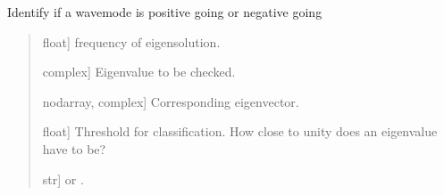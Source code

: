 \documentclass[letterpaper,10pt,english]{sphinxmanual}
\begin{document}
\begin{fulllineitems}
\label{\detokenize{core:pywfe.core.classify_modes.classify_wavemode}}
\pysigstartsignatures
{}
\pysigstopsignatures
\sphinxAtStartPar
Identify if a wavemode is positive going or negative going
\begin{quote}\begin{description}
\begin{description}
\sphinxlineitem{\sphinxstylestrong{f}}{[}float{]}
\sphinxAtStartPar
frequency of eigensolution.

\sphinxlineitem{\sphinxstylestrong{eigenvalue}}{[}complex{]}
\sphinxAtStartPar
Eigenvalue to be checked.

\sphinxlineitem{\sphinxstylestrong{eigenvector}}{[}nodarray, complex{]}
\sphinxAtStartPar
Corresponding eigenvector.

\sphinxlineitem{\sphinxstylestrong{threshold}}{[}float{]}
\sphinxAtStartPar
Threshold for classification. How close to unity does an eigenvalue have to be?

\end{description}

\begin{description}
\sphinxlineitem{\sphinxstylestrong{direction}}{[}str{]}
\sphinxAtStartPar
{} or .

\end{description}

\end{description}\end{quote}

\end{fulllineitems}

\end{document}
